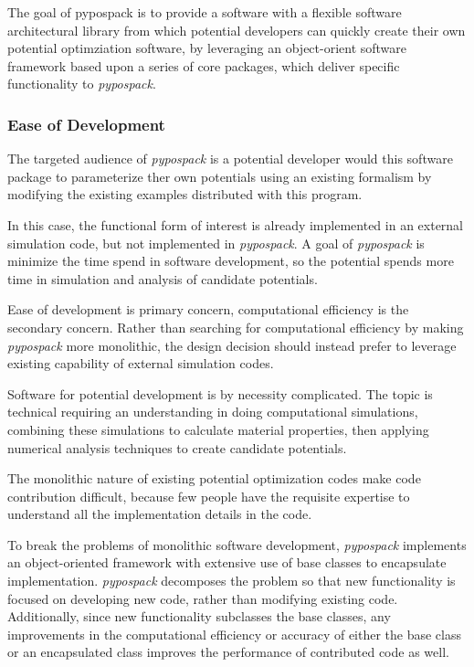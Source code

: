 The goal of pypospack is to provide a software with a flexible software architectural library from which potential developers can quickly create their own potential optimziation software, by leveraging an object-orient software framework based upon a series of core packages, which deliver specific functionality to \emph{pypospack}.

\subsubsection{Ease of Development}
The targeted audience of \emph{pypospack} is a potential developer would this software package to parameterize ther own potentials using an existing formalism by modifying the existing examples distributed with this program.

In this case, the functional form of interest is already implemented in an external simulation code, but not implemented in \emph{pypospack}.  A goal of \emph{pypospack} is minimize the time spend in software development, so the potential spends more time in simulation and analysis of candidate potentials.

Ease of development is primary concern, computational efficiency is the secondary concern.
Rather than searching for computational efficiency by making \emph{pypospack} more monolithic, the design decision should instead prefer to leverage existing capability of external simulation codes.

Software for potential development is by necessity complicated.  The topic is technical requiring an understanding in doing computational simulations, combining these simulations to calculate material properties, then applying numerical analysis techniques to create candidate potentials.

The monolithic nature of existing potential optimization codes make code contribution difficult, because few people have the requisite expertise to understand all the implementation details in the code.

To break the problems of monolithic software development, \emph{pypospack} implements an object-oriented framework with extensive use of base classes to encapsulate implementation.  \emph{pypospack} decomposes the problem so that new functionality is focused on developing new code, rather than modifying existing code.  Additionally, since new functionality subclasses the base classes, any improvements in the computational efficiency or accuracy of either the base class or an encapsulated class improves the performance of contributed code as well.

